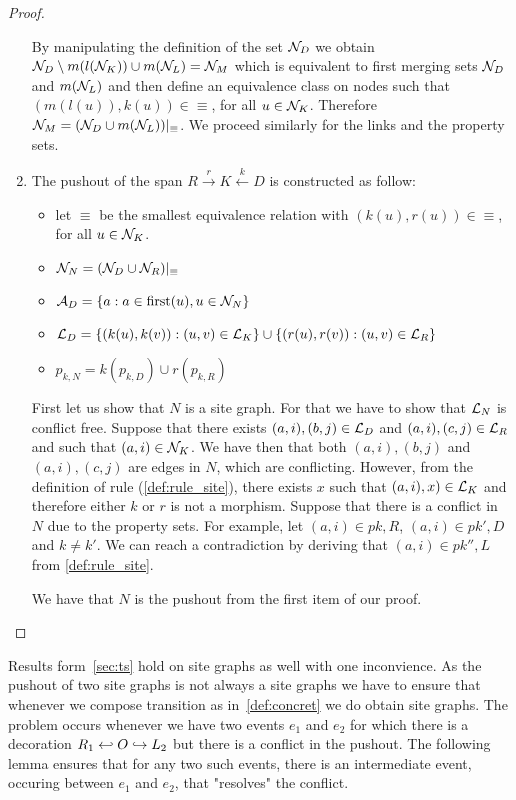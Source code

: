 \begin{proof}
\begin{enumerate}
    By manipulating the definition of the set $\mathcal{N}_D$ we obtain $\mathcal{N}_D\setminus m(l(\mathcal{N}_K))\cup m(\mathcal{N}_L) = \mathcal{N}_M$ which is equivalent to first merging sets $\mathcal{N}_D$ and $m(\mathcal{N}_L)$ and then define an equivalence class on nodes such that $(m(l(u)),k(u))\in\equiv$, for all $u\in\mathcal{N}_K$. Therefore $\mathcal{N}_M = (\mathcal{N}_D\cup m(\mathcal{N}_L))|_{\equiv}$. We proceed similarly for the links and the property sets.

  \item The pushout of the span $R\overset{r}{\rightarrow}K\overset{k}{\leftarrow} D$  is constructed as follow:
    \begin{itemize}
    \item let $\equiv$ be the smallest equivalence relation with $(k(u),r(u))\in\equiv$, for all $u\in\mathcal{N}_K$.
    \item $\mathcal{N}_N = (\mathcal{N}_D\cup \mathcal{N}_R)|_{\equiv}$
    \item $\mathcal{A}_D = \{a: a\in \text{first}(u), u\in\mathcal{N}_N\}$
    \item $\mathcal{L}_D = \{(k(u),k(v)) : (u,v)\in\mathcal{L}_K\}\cup\{(r(u),r(v)) : (u,v)\in\mathcal{L}_R\}$
    \item $p_{k,N} = k(p_{k,D}) \cup r(p_{k,R})$
    \end{itemize}
    First let us show that $N$ is a site graph. For that we have to show that $\mathcal{L}_N$ is conflict free. Suppose that there exists $(a,i),(b,j)\in \mathcal{L}_D$ and $(a,i),(c,j)\in \mathcal{L}_R$ and such that $(a,i)\in\mathcal{N}_K$. We have then that both $(a,i),(b,j)$ and $(a,i),(c,j)$ are edges in $N$, which are conflicting. However, from the definition of rule (\autoref{def:rule_site}), there exists $x$ such that $(a,i),x)\in\mathcal{L}_K$ and therefore either $k$ or $r$ is not a morphism.
%
    Suppose that there is a conflict in $N$ due to the property sets. For example, let $(a,i)\in p{k,R}$, $(a,i)\in p{k',D}$ and $k\neq k'$. We can reach a contradiction by deriving that $(a,i)\in p{k'',L}$ from \autoref{def:rule_site}.

    We have that $N$ is the pushout from the first item of our proof.
 \end{enumerate}
 \end{proof}

%
Results form~\autoref{sec:ts} hold on site graphs as well with one inconvience. As the pushout of two site graphs is not always a site graphs we have to ensure that whenever we compose transition as in~\autoref{def:concret} we do obtain site graphs. The problem occurs whenever we have two events $e_1$ and $e_2$ for which there is a decoration $R_1\hookleftarrow O\hookrightarrow L_2$ but there is a conflict in the pushout.
The following lemma ensures that for any two such events, there is an intermediate event, occuring between $e_1$ and $e_2$, that "resolves" the conflict.

